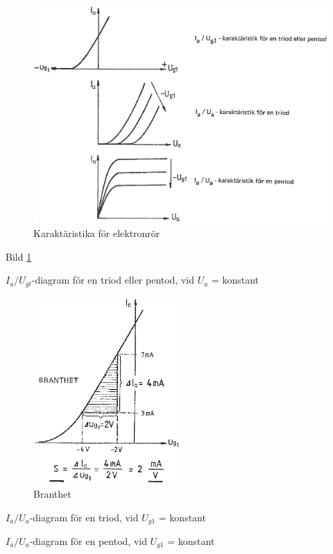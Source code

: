 \begin{figure}
\includegraphics[width=\textwidth]{images/bild_2_2-32.png}
\caption{Karaktäristika för elektronrör}
\label{fig:BildII2-32}
\end{figure}

Bild \ref{fig:BildII2-32}

\(I_a/U_{gt}\)-diagram för en triod eller pentod, vid \(U_a\) = konstant

\begin{figure}
\includegraphics[width=0.5\textwidth]{images/bild_2_2-33.png}
\caption{Branthet}
\label{fig:BildII2-33}
\end{figure}

\(I_a/U_a\)-diagram för en triod, vid \(U_{g1}\) = konstant

\(I_a/U_a\)-diagram för en pentod, vid \(U_{g1}\) = konstant

